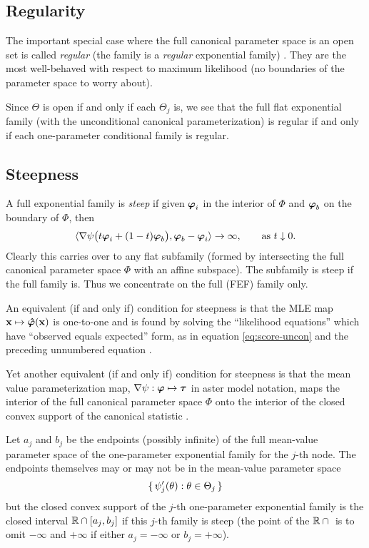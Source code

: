 \subsection{Regularity}

The important special case where the full canonical parameter space is an
open set is called \emph{regular} (the family is a \emph{regular} exponential
family) \citep[p.~116]{barndorff}.  They are the most well-behaved with respect
to maximum likelihood (no boundaries of the parameter space to worry about).

Since $\Theta$ is open if and only if each $\Theta_j$ is, we see that
the full flat exponential family (with the unconditional canonical
parameterization) is regular if and only if each one-parameter conditional
family is regular.

\subsection{Steepness}

A full exponential family is \emph{steep} \cite[p.~117]{barndorff} if
given ${\boldsymbol{\varphi}}_i$ in the interior of $\Phi$ and ${\boldsymbol{\varphi}}_b$ on the
boundary of $\Phi$, then
$$
   \langle \nabla \psi\bigl(t {\boldsymbol{\varphi}}_i + (1 - t) {\boldsymbol{\varphi}}_b \bigr),
   {\boldsymbol{\varphi}}_b - {\boldsymbol{\varphi}}_i \rangle \to \infty,
   \qquad \text{as $t \downarrow 0$}.
$$
Clearly this carries over to any flat subfamily (formed by intersecting
the full canonical parameter space $\Phi$ with an affine subspace).
The subfamily is steep if the full family is.  Thus we concentrate on
the full (FEF) family only.

An equivalent (if and only if) condition for steepness is that the MLE map
$\mathbf{x} \mapsto {\boldsymbol{\hat{\varphi}}}(\mathbf{x})$ is one-to-one and is found by
solving the ``likelihood equations'' which have ``observed equals expected''
form, as in equation \eqref{eq:score-uncon} and the preceding unnumbered
equation \citep[Theorem~9.14, Corollary~9.6 and their surrounding
discussion]{barndorff}.

Yet another equivalent (if and only if) condition for steepness is that
the mean value parameterization
map, $\nabla \psi : {\boldsymbol{\varphi}} \mapsto {\boldsymbol{\tau}}$ in aster model notation,
maps the interior of the full canonical parameter space $\Phi$ onto the
interior of the closed convex support of the canonical statistic
\citep[pp.~117, 142, and 152]{barndorff}.

Let $a_j$ and $b_j$ be the endpoints (possibly infinite) of the full
mean-value parameter space of the one-parameter exponential family
for the $j$-th node.  The endpoints themselves may or may not be in
the mean-value parameter space
$$
   \{\,  \psi_j'(\theta) : \theta \in \Theta_j  \,\}
$$
but the closed convex support of the $j$-th one-parameter exponential
family is the closed interval
$\mathbb{R} \cap [a_j, b_j]$ if this $j$-th family is steep
(the point of the $\mathbb{R} \cap \vphantom{a_j}$ is
to omit $- \infty$ and $+ \infty$
if either $a_j = - \infty$ or $b_j = + \infty$).


